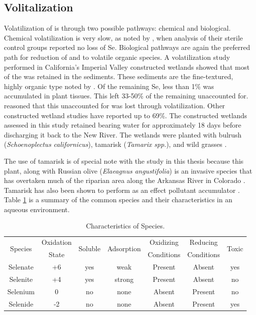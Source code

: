 \subsection*{\Se Volitalization}
Volatilization of \Se is through two possible pathways: chemical and biological.  Chemical volatilization is very slow, as noted by \textcite{Besser1989}, when analysis of their sterile control groups reported no loss of Se. Biological pathways are again the preferred path for reduction of \selenate and \selenite to volatile organic \Se species.  A \Se volatilization study performed in California's Imperial Valley constructed wetlands showed that most of the \Se was retained in the sediments.  These sediments are the fine-textured, highly organic type noted by \textcite{Besser1989}.  Of the remaining Se, less than 1\% was accumulated in plant tissues.  This left 33-50\% of the remaining \Se unaccounted for.  \textcite{Gersberg2006} reasoned that this unaccounted for \Se was lost through volatilization.  Other constructed wetland studies have reported up to 69\%.  The constructed wetlands assessed in this study retained \Se bearing water for approximately 18 days before discharging it back to the New River.  The wetlands were planted with bulrush (\textit{Schoenoplectus californicus}), tamarisk (\textit{Tamarix spp.}), and wild grasses \parencite{Gersberg2006,johnson2009}.  

The use of tamarisk is of special note with the study in this thesis because this plant, along with Russian olive (\textit{Elaeagnus angustifolia}) is an invasive species that has overtaken much of the riparian area along the Arkansas River in Colorado \parencite{Nagler2010a}.  Tamarisk has also been shown to perform as an effect pollutant accumulator \parencite{Sorensen2009}. Table \ref{tab:SeSpeciesCharacteristics} is a summary of the common \Se species and their characteristics in an aqueous environment.

\begin{table}[!htbp]
\centering
\caption[Characteristics of \Se Species.]{Characteristics of \Se Species.}
\label{tab:SeSpeciesCharacteristics}
\begin{tabular}{ccccccc} 
\toprule
	\multirow{2}{*}{\Se Species} & Oxidation & \multirow{2}{*}{Soluble} & \multirow{2}{*}{Adsorption} & Oxidizing & Reducing & \multirow{2}{*}{Toxic} \\
		& State &  & & Conditions & Conditions & \\ 
\midrule
	Selenate & +6 & yes & weak & Present & Absent & yes \\
	Selenite & +4 & yes & strong & Present & Absent & no \\
	Selenium & 0 & no & none & Absent & Present & no \\
	Selenide & -2 & no & none & Absent & Present & yes \\
\bottomrule
\end{tabular}
\end{table}


